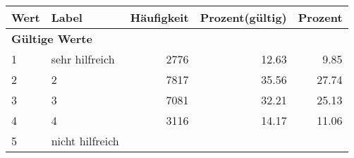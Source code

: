      \begin{longtable}{lXrrr}
     \toprule
     \textbf{Wert} & \textbf{Label} & \textbf{Häufigkeit} & \textbf{Prozent(gültig)} & \textbf{Prozent} \\
     \endhead
     \midrule
     \multicolumn{5}{l}{\textbf{Gültige Werte}}\\

     1 &
     \multicolumn{1}{X}{ sehr hilfreich   } &


       \num{2776} &
       \num[round-mode=places,round-precision=2]{12,63} &
         \num[round-mode=places,round-precision=2]{9,85} \\

     2 &
     \multicolumn{1}{X}{ 2   } &


       \num{7817} &
       \num[round-mode=places,round-precision=2]{35,56} &
         \num[round-mode=places,round-precision=2]{27,74} \\

     3 &
     \multicolumn{1}{X}{ 3   } &


       \num{7081} &
       \num[round-mode=places,round-precision=2]{32,21} &
         \num[round-mode=places,round-precision=2]{25,13} \\

     4 &
     \multicolumn{1}{X}{ 4   } &


       \num{3116} &
       \num[round-mode=places,round-precision=2]{14,17} &
         \num[round-mode=places,round-precision=2]{11,06} \\

     5 &
     \multicolumn{1}{X}{ nicht hilfreich   } &



\end{longtable}
